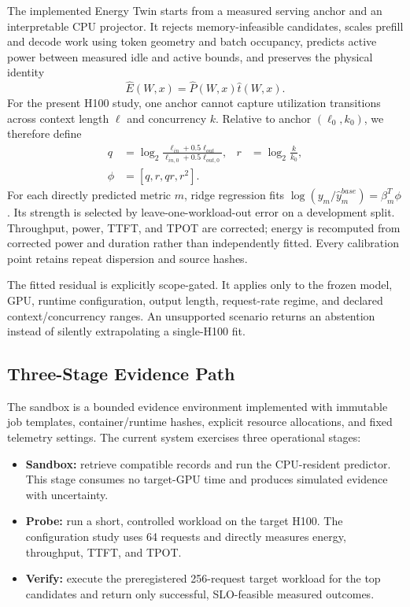 The implemented Energy Twin starts from a measured serving anchor and an
interpretable CPU projector.  It rejects memory-infeasible candidates, scales
prefill and decode work using token geometry and batch occupancy, predicts
active power between measured idle and active bounds, and preserves the
physical identity
\begin{equation}
\widehat E(W,x)=\widehat P(W,x)\widehat t(W,x).
\label{eq:energy-identity}
\end{equation}
For the present H100 study, one anchor cannot capture utilization transitions
across context length $\ell$ and concurrency $k$.  Relative to anchor
$(\ell_0,k_0)$, we therefore define
\begin{align}
q&=\log_2\!\frac{\ell_{in}+0.5\ell_{out}}
                         {\ell_{in,0}+0.5\ell_{out,0}}, &
r&=\log_2\!\frac{k}{k_0},\\[-3pt]
\phi&=[q,r,qr,r^2].&&
\end{align}
For each directly predicted metric $m$, ridge regression fits
$\log(y_m/\widehat y_m^{base})=\beta_m^T\phi$.  Its strength is selected by
leave-one-workload-out error on a development split.  Throughput, power, TTFT,
and TPOT are corrected; energy is recomputed from corrected power and duration
rather than independently fitted.  Every calibration point retains repeat
dispersion and source hashes.

The fitted residual is explicitly scope-gated.  It applies only to the frozen
model, GPU, runtime configuration, output length, request-rate regime, and
declared context/concurrency ranges.  An unsupported scenario returns an
abstention instead of silently extrapolating a single-H100 fit.

\subsection{Three-Stage Evidence Path}

The sandbox is a bounded evidence environment implemented with immutable job
templates, container/runtime hashes, explicit resource allocations, and fixed
telemetry settings.  The current system exercises three operational stages:

\begin{itemize}
    \item \textbf{Sandbox:} retrieve compatible \bench{} records
    and run the CPU-resident predictor.  This stage consumes no target-GPU time
    and produces simulated evidence with uncertainty.
    \item \textbf{Probe:} run a short, controlled workload on the
    target H100.  The configuration study uses 64 requests and directly measures
    energy, throughput, TTFT, and TPOT.
    \item \textbf{Verify:} execute the preregistered 256-request
    target workload for the top candidates and return only successful,
    SLO-feasible measured outcomes.
\end{itemize}


